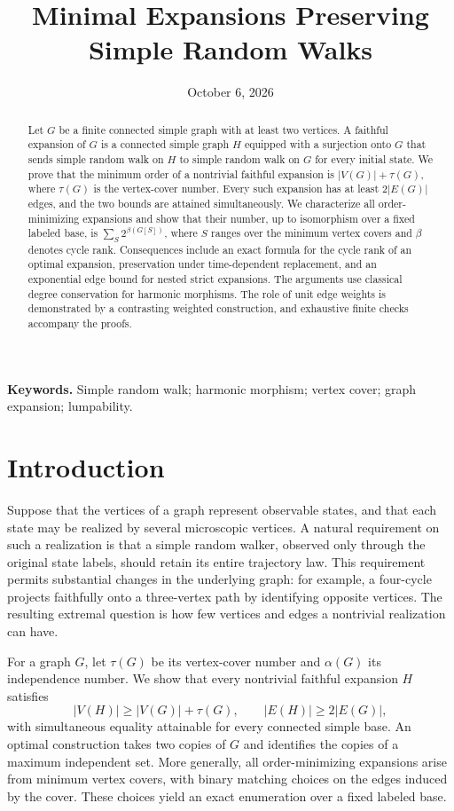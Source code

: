 \documentclass[11pt]{article}
\title{Minimal Expansions Preserving Simple Random Walks}
\author{}
\date{October 6, 2026}
\theoremstyle{definition}
\numberwithin{equation}{section}
\newcommand{\V}{V}
\newcommand{\E}{E}
\begin{document}
\maketitle

\begin{abstract}
Let $G$ be a finite connected simple graph with at least two vertices.
A faithful expansion of $G$ is a connected simple graph $H$ equipped with
a surjection onto $G$ that sends simple random walk on $H$ to simple random
walk on $G$ for every initial state. We prove that the minimum order of a
nontrivial faithful expansion is $|\V(G)|+\tau(G)$, where $\tau(G)$ is the
vertex-cover number. Every such expansion has at least $2|\E(G)|$ edges,
and the two bounds are attained simultaneously. We characterize all
order-minimizing expansions and show that their number, up to isomorphism
over a fixed labeled base, is
$\sum_{S}2^{\beta(G[S])}$, where $S$ ranges over the minimum vertex covers
and $\beta$ denotes cycle rank. Consequences include an exact formula for
the cycle rank of an optimal expansion, preservation under time-dependent
replacement, and an exponential edge bound for nested strict expansions.
The arguments use classical degree conservation for harmonic morphisms.
The role of unit edge weights is demonstrated by a contrasting weighted
construction, and exhaustive finite checks accompany the proofs.
\end{abstract}

\medskip
\noindent\textbf{Keywords.} Simple random walk; harmonic morphism; vertex cover;
graph expansion; lumpability.

\section{Introduction}\label{sec:intro}

Suppose that the vertices of a graph represent observable states, and that
each state may be realized by several microscopic vertices. A natural
requirement on such a realization is that a simple random walker, observed
only through the original state labels, should retain its entire trajectory
law. This requirement permits substantial changes in the underlying graph:
for example, a four-cycle projects faithfully onto a three-vertex path by
identifying opposite vertices. The resulting extremal question is how few
vertices and edges a nontrivial realization can have.

For a graph $G$, let $\tau(G)$ be its vertex-cover number and $\alpha(G)$ its
independence number. We show that every nontrivial faithful expansion $H$
satisfies
\[
 |\V(H)|\ge |\V(G)|+\tau(G),\qquad
 |\E(H)|\ge 2|\E(G)|,
\]
with simultaneous equality attainable for every connected simple base.
An optimal construction takes two copies of $G$ and identifies the copies
of a maximum independent set. More generally, all order-minimizing
expansions arise from minimum vertex covers, with binary matching choices
on the edges induced by the cover. These choices yield an exact enumeration
over a fixed labeled base.
\end{document}
